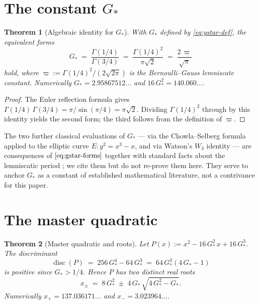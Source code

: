 \documentclass[11pt,reqno]{amsart}
\theoremstyle{plain}
\newtheorem{theorem}{Theorem}[section]
\theoremstyle{definition}
\theoremstyle{remark}
\numberwithin{equation}{section}
\newcommand{\Gstar}{G_{\!*}}
\newcommand{\disc}{\operatorname{disc}}
\begin{document}
\section{The constant $\Gstar$}
\label{sec:gstar}

\begin{theorem}[Algebraic identity for $\Gstar$]
\label{thm:gstar}
With $\Gstar$ defined by \eqref{eq:gstar-def}, the equivalent forms
\begin{equation}
\label{eq:gstar-forms}
  \Gstar \;=\; \frac{\Gamma(1/4)}{\Gamma(3/4)}
        \;=\; \frac{\Gamma(1/4)^{2}}{\pi\sqrt{2}}
        \;=\; \frac{2\,\varpi}{\sqrt{\pi}}
\end{equation}
hold, where $\varpi := \Gamma(1/4)^{2}/(2\sqrt{2\pi})$ is the
Bernoulli--Gauss lemniscate constant. Numerically
$\Gstar = 2.95867512\ldots$ and $16\,\Gstar^{2} = 140.060\ldots$.
\end{theorem}

\begin{proof}
The Euler reflection formula gives
$\Gamma(1/4)\,\Gamma(3/4) = \pi/\sin(\pi/4) = \pi\sqrt{2}$. Dividing
$\Gamma(1/4)^{2}$ through by this identity yields the second form;
the third follows from the definition of $\varpi$.
\end{proof}

The two further classical evaluations of $\Gstar$ --- via the
Chowla--Selberg formula applied to the elliptic curve
$E\colon y^{2} = x^{3} - x$, and via Watson's $W_{3}$ identity
\cite{watson1939} --- are consequences of $\eqref{eq:gstar-forms}$
together with standard facts about the lemniscatic period
\cite{chowla-selberg, glasser-zucker}; we cite them but do not
re-prove them here. They serve to anchor $\Gstar$ as a constant of
established mathematical literature, not a contrivance for this
paper.

\section{The master quadratic}
\label{sec:masterq}

\begin{theorem}[Master quadratic and roots]
\label{thm:masterq}
Let $P(x) := x^{2} - 16\,\Gstar^{2}\,x + 16\,\Gstar^{3}$. The
discriminant
\begin{equation}
\label{eq:disc}
  \disc(P) \;=\; 256\,\Gstar^{4} - 64\,\Gstar^{3}
            \;=\; 64\,\Gstar^{3}(4\,\Gstar - 1)
\end{equation}
is positive since $\Gstar > 1/4$. Hence $P$ has two distinct real
roots
\begin{equation}
\label{eq:roots}
  x_{\pm} \;=\; 8\,\Gstar^{2} \;\pm\; 4\,\Gstar\,\sqrt{4\,\Gstar^{2} - \Gstar}.
\end{equation}
Numerically $x_{+} = 137.036171\ldots$ and $x_{-} = 3.023964\ldots$.
\end{theorem}
\end{document}
